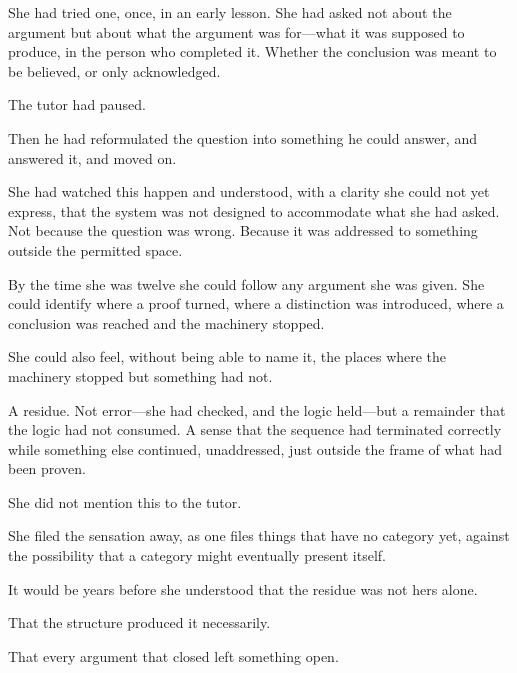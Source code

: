 She had tried one, once, in an early lesson. She had asked not
about the argument but about what the argument was for---what it
was supposed to produce, in the person who completed it. Whether
the conclusion was meant to be believed, or only acknowledged.

The tutor had paused.

Then he had reformulated the question into something he could
answer, and answered it, and moved on.

She had watched this happen and understood, with a clarity she
could not yet express, that the system was not designed to
accommodate what she had asked. Not because the question was
wrong. Because it was addressed to something outside the
permitted space.

\scenebreak

By the time she was twelve she could follow any argument she was
given. She could identify where a proof turned, where a
distinction was introduced, where a conclusion was reached and
the machinery stopped.

She could also feel, without being able to name it, the places
where the machinery stopped but something had not.

A residue. Not error---she had checked, and the logic held---but
a remainder that the logic had not consumed. A sense that the
sequence had terminated correctly while something else continued,
unaddressed, just outside the frame of what had been proven.

She did not mention this to the tutor.

She filed the sensation away, as one files things that have no
category yet, against the possibility that a category might
eventually present itself.

It would be years before she understood that the residue was not
hers alone.

That the structure produced it necessarily.

That every argument that closed left something open.
